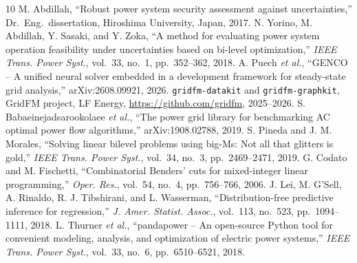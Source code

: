\documentclass[conference]{IEEEtran}
\theoremstyle{remark}
\begin{document}
\begin{thebibliography}{10}
 M. Abdillah, ``Robust power system security assessment
against uncertainties,'' Dr.\ Eng.\ dissertation, Hiroshima University, Japan, 2017.
 N. Yorino, M. Abdillah, Y. Sasaki, and Y. Zoka, ``A method for
evaluating power system operation feasibility under uncertainties based on bi-level
optimization,'' \emph{IEEE Trans. Power Syst.}, vol.~33, no.~1, pp.~352--362, 2018.
 A. Puech \emph{et al.}, ``GENCO -- A unified neural solver embedded
in a development framework for steady-state grid analysis,'' arXiv:2608.09921, 2026.
 \texttt{gridfm-datakit} and \texttt{gridfm-graphkit}, GridFM
project, LF Energy, \url{https://github.com/gridfm}, 2025--2026.
 S. Babaeinejadsarookolaee \emph{et al.}, ``The power grid library for
benchmarking AC optimal power flow algorithms,'' arXiv:1908.02788, 2019.
 S. Pineda and J. M. Morales, ``Solving linear bilevel problems
using big-Ms: Not all that glitters is gold,'' \emph{IEEE Trans. Power Syst.}, vol.~34,
no.~3, pp.~2469--2471, 2019.
 G. Codato and M. Fischetti, ``Combinatorial Benders' cuts for
mixed-integer linear programming,'' \emph{Oper. Res.}, vol.~54, no.~4, pp.~756--766, 2006.
 J. Lei, M. G'Sell, A. Rinaldo, R. J. Tibshirani, and L. Wasserman,
``Distribution-free predictive inference for regression,'' \emph{J. Amer. Statist.
Assoc.}, vol.~113, no.~523, pp.~1094--1111, 2018.
 L. Thurner \emph{et al.}, ``pandapower -- An open-source Python
tool for convenient modeling, analysis, and optimization of electric power systems,''
\emph{IEEE Trans. Power Syst.}, vol.~33, no.~6, pp.~6510--6521, 2018.
\end{thebibliography}
\end{document}
